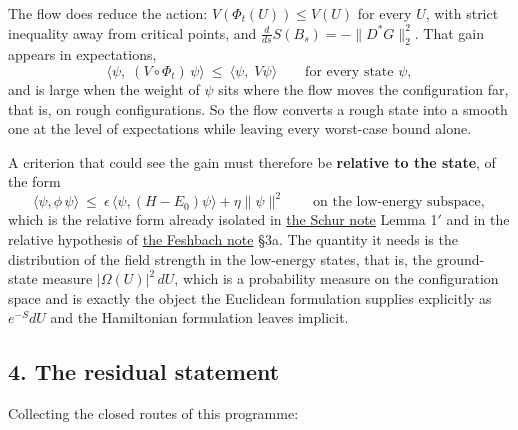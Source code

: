 \documentclass[11pt,a4paper]{article}
\begin{document}
The flow does reduce the action: \(V(\Phi_t(U))\le V(U)\) for every
\(U\), with strict inequality away from critical points, and
\(\frac{d}{ds}S(B_s)=-\|D^*G\|_2^2\). That gain appears in expectations,
\[\big\langle\psi,\;(V\circ\Phi_t)\,\psi\big\rangle\ \le\ \big\langle\psi,\;V\psi\big\rangle
\qquad\text{for every state }\psi,\] and is large when the weight of
\(\psi\) sits where the flow moves the configuration far, that is, on
rough configurations. So the flow converts a rough state into a smooth
one at the level of expectations while leaving every worst-case bound
alone.

A criterion that could see the gain must therefore be \textbf{relative
to the state}, of the form
\[\big\langle\psi,\phi\,\psi\big\rangle\ \le\ \epsilon\,\big\langle\psi,(H-E_0)\psi\big\rangle+\eta\|\psi\|^2
\qquad\text{on the low-energy subspace},\] which is the relative form
already isolated in \href{schur-error-ultraviolet.md}{the Schur note}
Lemma 1\('\) and in the relative hypothesis of
\href{weak-coupling-feshbach-reduction.md}{the Feshbach note} §3a. The
quantity it needs is the distribution of the field strength in the
low-energy states, that is, the ground-state measure
\(|\Omega(U)|^2\,dU\), which is a probability measure on the
configuration space and is exactly the object the Euclidean formulation
supplies explicitly as \(e^{-S}dU\) and the Hamiltonian formulation
leaves implicit.

\hypertarget{the-residual-statement}{%
\subsection{4. The residual statement}\label{the-residual-statement}}

Collecting the closed routes of this programme:
\end{document}
